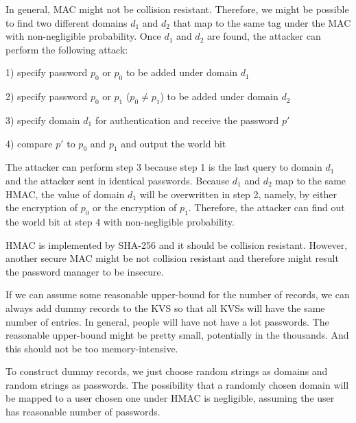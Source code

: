 \documentclass[12pt]{article}
\newenvironment{question}[2][Question]{\begin{trivlist}
\item[\hskip \labelsep {\bfseries #1}\hskip \labelsep {\bfseries #2.}]}{\end{trivlist}}
\begin{document}
\begin{question}{4} 
In general, MAC might not be collision resistant. Therefore, we might be possible to find two different domains $d_1$ and $d_2$ that map to the same tag under the MAC with non-negligible probability. Once $d_1$ and $d_2$ are found, the attacker can perform the following attack:

1) specify password $p_0$ or $p_0$ to be added under domain $d_1$

2) specify password $p_0$ or $p_1$ ($p_0 \not= p_1$) to be added under domain $d_2$

3) specify domain $d_1$ for authentication and receive the password $p'$

4) compare $p'$ to $p_0$ and $p_1$ and output the world bit

The attacker can perform step 3 because step 1 is the last query to domain $d_1$ and the attacker sent in identical passwords. Because $d_1$ and $d_2$ map to the same HMAC, the value of domain $d_1$ will be overwritten in step 2, namely, by either the encryption of $p_0$ or the encryption of $p_1$. Therefore, the attacker can find out the world bit at step 4 with non-negligible probability.

HMAC is implemented by SHA-256 and it should be collision resistant. However, another secure MAC might be not collision resistant and therefore might result the password manager to be insecure.

\end{question}



\begin{question}{5} 
If we can assume some reasonable upper-bound for the number of records, we can always add dummy records to the KVS so that all KVSs will have the same number of entries. In general, people will have not have a lot passwords. The reasonable upper-bound might be pretty small, potentially in the thousands. And this should not be too memory-intensive. 

To construct dummy records, we just choose random strings as domains and random strings as passwords. The possibility that a randomly chosen domain will be mapped to a user chosen one under HMAC is negligible, assuming the user has reasonable number of passwords.

\end{question}

 
 
\end{document}
